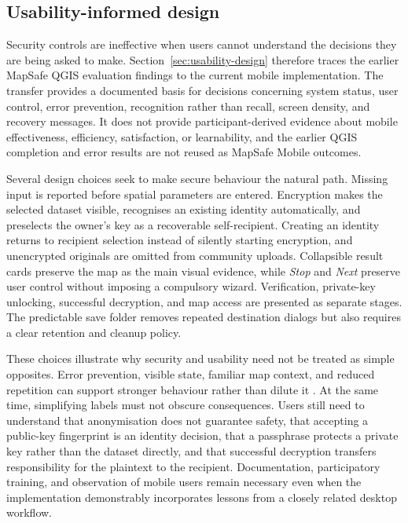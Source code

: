 \documentclass[a4paper,UKenglish,cleveref,autoref,thm-restate]{lipics-v2021}
\begin{document}
\subsection{Usability-informed design}

Security controls are ineffective when users cannot understand the decisions they are being asked to make. Section~\ref{sec:usability-design} therefore traces the earlier MapSafe QGIS evaluation findings to the current mobile implementation. The transfer provides a documented basis for decisions concerning system status, user control, error prevention, recognition rather than recall, screen density, and recovery messages. It does not provide participant-derived evidence about mobile effectiveness, efficiency, satisfaction, or learnability, and the earlier QGIS completion and error results are not reused as MapSafe Mobile outcomes.

Several design choices seek to make secure behaviour the natural path. Missing input is reported before spatial parameters are entered. Encryption makes the selected dataset visible, recognises an existing identity automatically, and preselects the owner's key as a recoverable self-recipient. Creating an identity returns to recipient selection instead of silently starting encryption, and unencrypted originals are omitted from community uploads. Collapsible result cards preserve the map as the main visual evidence, while \emph{Stop} and \emph{Next} preserve user control without imposing a compulsory wizard. Verification, private-key unlocking, successful decryption, and map access are presented as separate stages. The predictable save folder removes repeated destination dialogs but also requires a clear retention and cleanup policy.

These choices illustrate why security and usability need not be treated as simple opposites. Error prevention, visible state, familiar map context, and reduced repetition can support stronger behaviour rather than dilute it \citep{nielsen1995conduct}. At the same time, simplifying labels must not obscure consequences. Users still need to understand that anonymisation does not guarantee safety, that accepting a public-key fingerprint is an identity decision, that a passphrase protects a private key rather than the dataset directly, and that successful decryption transfers responsibility for the plaintext to the recipient. Documentation, participatory training, and observation of mobile users remain necessary even when the implementation demonstrably incorporates lessons from a closely related desktop workflow.
\end{document}
